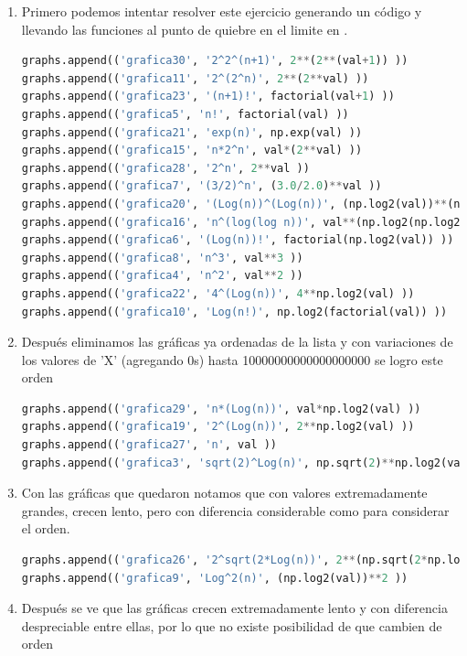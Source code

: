\documentclass{article}
\begin{document}
\begin{enumerate}
\item Primero podemos intentar resolver este ejercicio generando un código y llevando las funciones al punto de quiebre en el limite en \infty.

\begin{lstlisting}[language=Python]
graphs.append(('grafica30', '2^2^(n+1)', 2**(2**(val+1)) ))
graphs.append(('grafica11', '2^(2^n)', 2**(2**val) ))
graphs.append(('grafica23', '(n+1)!', factorial(val+1) ))
graphs.append(('grafica5', 'n!', factorial(val) ))
graphs.append(('grafica21', 'exp(n)', np.exp(val) ))
graphs.append(('grafica15', 'n*2^n', val*(2**val) ))
graphs.append(('grafica28', '2^n', 2**val ))
graphs.append(('grafica7', '(3/2)^n', (3.0/2.0)**val ))
graphs.append(('grafica20', '(Log(n))^(Log(n))', (np.log2(val))**(np.log2(val)) ))
graphs.append(('grafica16', 'n^(log(log n))', val**(np.log2(np.log2(val))) ))
graphs.append(('grafica6', '(Log(n))!', factorial(np.log2(val)) ))
graphs.append(('grafica8', 'n^3', val**3 ))
graphs.append(('grafica4', 'n^2', val**2 ))
graphs.append(('grafica22', '4^(Log(n))', 4**np.log2(val) ))
graphs.append(('grafica10', 'Log(n!)', np.log2(factorial(val)) ))
\end{lstlisting}

\item Después eliminamos las gráficas ya ordenadas de la lista y con variaciones de los valores de 'X' (agregando 0s) hasta 10000000000000000000 se logro este orden

\begin{lstlisting}[language=Python]
graphs.append(('grafica29', 'n*(Log(n))', val*np.log2(val) ))
graphs.append(('grafica19', '2^(Log(n))', 2**np.log2(val) ))
graphs.append(('grafica27', 'n', val ))
graphs.append(('grafica3', 'sqrt(2)^Log(n)', np.sqrt(2)**np.log2(val) ))
\end{lstlisting}

\item Con las gráficas que quedaron notamos que con valores extremadamente grandes, crecen lento, pero con diferencia considerable como para considerar el orden.

\begin{lstlisting}[language=Python]
graphs.append(('grafica26', '2^sqrt(2*Log(n))', 2**(np.sqrt(2*np.log2(val))) ))
graphs.append(('grafica9', 'Log^2(n)', (np.log2(val))**2 ))
\end{lstlisting}

\item Después se ve que las gráficas crecen extremadamente lento y con diferencia despreciable entre ellas, por lo que no existe posibilidad de que cambien de orden


\end{enumerate}
\end{document}
